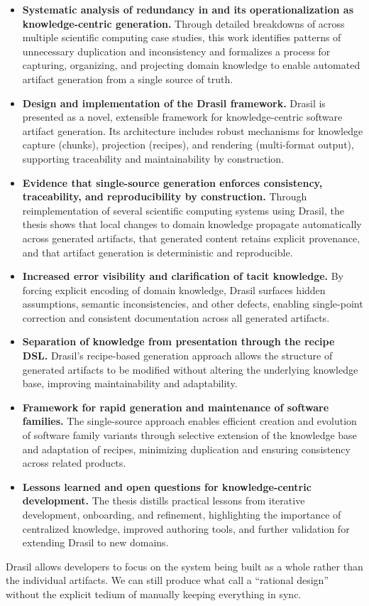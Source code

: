 \begin{itemize}
    \item \textbf{Systematic analysis of redundancy in \sfs{} and 
    its operationalization as knowledge-centric generation.} Through detailed 
    breakdowns of \sfs{} across multiple scientific computing case studies, 
    this work identifies patterns of unnecessary duplication and inconsistency 
    and formalizes a process for capturing, organizing, and projecting domain 
    knowledge to enable automated artifact generation from a single source of 
    truth.

    \item \textbf{Design and implementation of the Drasil framework.}
    Drasil is presented as a novel, extensible framework for knowledge-centric
    software artifact generation. Its architecture includes robust mechanisms
    for knowledge capture (chunks), projection (recipes), and rendering 
    (multi-format output), supporting traceability and maintainability by 
    construction.

    \item \textbf{Evidence that single-source generation enforces 
    consistency, traceability, and reproducibility by construction.} Through 
    reimplementation of several scientific computing systems using Drasil, the 
    thesis shows that local changes to domain knowledge propagate 
    automatically across generated artifacts, that generated content retains 
    explicit provenance, and that artifact generation is deterministic and 
    reproducible.

    \item \textbf{Increased error visibility and clarification of tacit 
    knowledge.} By forcing explicit encoding of domain knowledge, Drasil 
    surfaces hidden assumptions, semantic inconsistencies, and other defects, 
    enabling single-point correction and consistent documentation across all 
    generated artifacts.

    \item \textbf{Separation of knowledge from presentation through the recipe 
    DSL.} Drasil's recipe-based generation approach allows the structure of 
    generated artifacts to be modified without altering the underlying 
    knowledge base, improving maintainability and adaptability.

    \item \textbf{Framework for rapid generation and maintenance of software 
    families.} The single-source approach enables efficient creation and 
    evolution of software family variants through selective extension of the 
    knowledge base and adaptation of recipes, minimizing duplication and 
    ensuring consistency across related products.

    \item \textbf{Lessons learned and open questions for knowledge-centric 
    development.} The thesis distills practical lessons from iterative 
    development, onboarding, and refinement, highlighting the importance of 
    centralized knowledge, improved authoring tools, and further validation 
    for extending Drasil to new domains.
\end{itemize}

Drasil allows developers to focus on the system being built as a whole rather 
than the individual artifacts. We can still produce what
\citet{ParnasAndClements1986} call a ``rational design'' without the explicit
tedium of manually keeping everything in sync.
